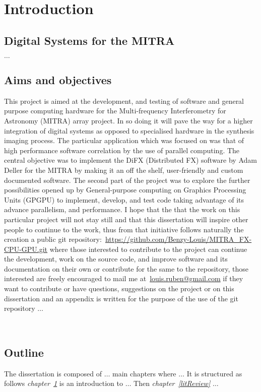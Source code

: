 
\chapter{Introduction} %

\label{Chapter1} %



\section{Digital Systems for the MITRA}
\label{sec:aboutDigiMITRA}
$\ldots$
\section{Aims and objectives}
\label{sec:aboutAimObjectives}
This project is aimed at the development, and testing of software and general purpose computing hardware for the Multi-frequency Interferometry for Astronomy (MITRA) array project. In so doing it will pave the way for a higher integration of digital systems as opposed to specialised hardware in the synthesis imaging process. The particular application which was focused on was that of high performance software correlation by the use of parallel computing. The central objective was to implement the DiFX (Distributed FX) software by Adam Deller for the MITRA by making it an off the shelf, user-friendly and custom documented software. The second part of the project was to explore the further possibilities opened up by General-purpose computing on Graphics Processing Units (GPGPU) to implement, develop, and test code taking advantage of its advance parallelism, and performance. I hope that the that the work on this particular project will not stay still and that this dissertation will inspire other people to continue to the work, thus from that initiative follows naturally the creation a public git repository:~\url{https://github.com/Benzy-Louis/MITRA_FX-CPU-GPU.git} where those interested to contribute to the project can continue the development, work on the source code, and improve software and its documentation on their own or contribute for the same to the repository, those interested are freely encouraged to mail me at~\href{mailto:louis.ruben@gmail.com}{louis.ruben@gmail.com} if they want to contribute or have questions, suggestions on the project or on this dissertation and an appendix is written for the purpose of the use of the git repository $\ldots$

\
\section{Outline}
\label{sec:outline}
The dissertation is composed of $\ldots$ main chapters where $\ldots$ It is structured as follows \textit{chapter~\ref{Chapter1}} is an introduction to $\ldots$ Then \textit{chapter~\ref{litReview}} $\ldots$